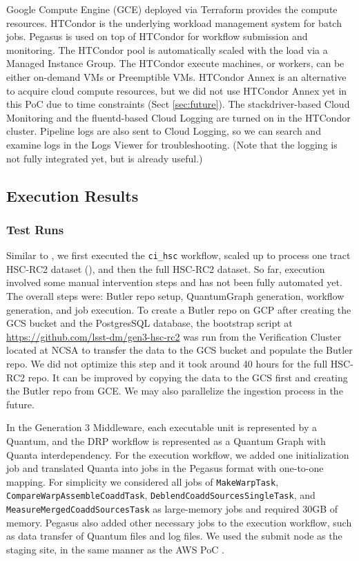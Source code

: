 Google Compute Engine (GCE) deployed via Terraform provides the compute resources.
HTCondor is the underlying workload management system for batch jobs.
Pegasus is used on top of HTCondor for workflow submission and monitoring.
The HTCondor pool is automatically scaled with the load via a Managed Instance Group.
The HTCondor execute machines, or workers, can be either on-demand VMs or Preemptible VMs.
HTCondor Annex is an alternative to acquire cloud compute resources, but we did not use HTCondor Annex yet in this PoC due to time constraints (Sect \ref{sec:future}).
The stackdriver-based Cloud Monitoring and the fluentd-based Cloud Logging are turned on in the HTCondor cluster.
Pipeline logs are also sent to Cloud Logging, so we can search and examine logs in the Logs Viewer for troubleshooting.
(Note that the logging is not fully integrated yet, but is already useful.)


\subsection{Execution Results}

\subsubsection{Test Runs}

Similar to , we first executed the \texttt{ci\_hsc} workflow, scaled up to process one tract HSC-RC2 dataset (), and then the full HSC-RC2 dataset.
So far, execution involved some manual intervention steps and has not been fully automated yet.
The overall steps were: Butler repo setup, QuantumGraph generation, workflow generation, and job execution.
To create a Butler repo on GCP after creating the GCS bucket and the PostgresSQL database, the bootstrap script at \url{https://github.com/lsst-dm/gen3-hsc-rc2} was run from the Verification Cluster located at NCSA to transfer the data to the GCS bucket and populate the Butler repo.
We did not optimize this step and it took around 40 hours for the full HSC-RC2 repo.
It can be improved by copying the data to the GCS first and creating the Butler repo from GCE.
We may also parallelize the ingestion process in the future.

In the Generation 3 Middleware, each executable unit is represented by a Quantum, and the DRP workflow is represented as a Quantum Graph with Quanta interdependency.
For the execution workflow, we added one initialization job and translated Quanta into jobs in the Pegasus format with one-to-one mapping.
For simplicity we considered all jobs of \texttt{MakeWarpTask}, \texttt{CompareWarpAssembleCoaddTask}, \texttt{DeblendCoaddSourcesSingleTask}, and \texttt{MeasureMergedCoaddSourcesTask} as large-memory jobs and required 30GB of memory.
Pegasus also added other necessary jobs to the execution workflow, such as data transfer of Quantum files and log files.
We used the submit node as the staging site, in the same manner as the AWS PoC .

